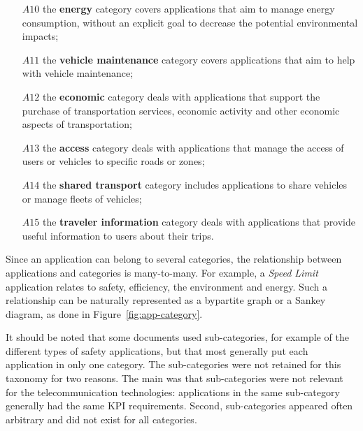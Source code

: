 \begin{enumerate}
\item[$A10$] the \textbf{energy} category covers applications that aim to manage energy consumption, without an explicit goal to decrease the potential environmental impacts;
\item[$A11$] the \textbf{vehicle maintenance} category covers applications that aim to help with vehicle maintenance;
\item[$A12$] the \textbf{economic} category deals with applications that support the purchase of transportation services, economic activity and other economic aspects of transportation;
\item[$A13$] the \textbf{access} category deals with applications that manage the access of users or vehicles to specific roads or zones; 
\item[$A14$] the \textbf{shared transport} category includes applications to share vehicles or manage fleets of vehicles;
\item[$A15$] the \textbf{traveler information} category deals with applications that provide useful information to users about their trips.
\end{enumerate}

Since an application can belong to several categories, the relationship between applications and categories is many-to-many. For example, a \emph{Speed Limit} application relates to safety, efficiency, the environment and energy. Such a relationship can be naturally represented as a bypartite graph or a Sankey diagram, as done in Figure~\ref{fig:app-category}.

It should be noted that some documents used sub-categories, for example of the different types of safety applications, but that most generally put each application in only one category. The sub-categories were not retained for this taxonomy for two reasons. The main was that sub-categories were not relevant for the telecommunication technologies: applications in the same sub-category generally had the same \acrshort{KPI} requirements. Second, sub-categories appeared often arbitrary and did not exist for all categories. 


